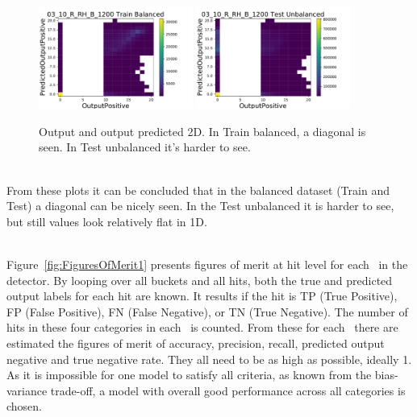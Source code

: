 \begin{figure}[t]
\centering
\includegraphics[width=0.45\textwidth]{plots/plot_04_1_overlay_histo2D_OutputPositive_PredictedOutputPositive_03_10_R_RH_B_1200_Train.pdf}
\includegraphics[width=0.45\textwidth]{plots/plot_04_1_overlay_histo2D_OutputPositive_PredictedOutputPositive_03_10_R_RH_B_1200_Test.pdf}\\
\caption{Output and output predicted 2D. In Train balanced, a diagonal is seen. In Test unbalanced it's harder to see.}
\label{fig:OutputOutputPredicted2D}
\end{figure}

\ \\From these plots it can be concluded that in the balanced dataset (Train and Test) a diagonal can be nicely seen. In the Test unbalanced it is harder to see, but still values look relatively flat in 1D. 

\ \\Figure~\ref{fig:FiguresOfMerit1} presents figures of merit at hit level for each \volumeID~in the detector. By looping over all buckets and all hits, both the true and predicted output labels for each hit are known. It results if the hit is TP (True Positive), FP (False Positive), FN (False Negative), or TN (True Negative). The number of hits in these four categories in each \volumeID~is counted. From these for each \volumeID~there are estimated the figures of merit of accuracy, precision, recall, predicted output negative and true negative rate. They all need to be as high as possible, ideally 1. As it is impossible for one model to satisfy all criteria, as known from the bias-variance trade-off, a model with overall good performance across all categories is chosen.

